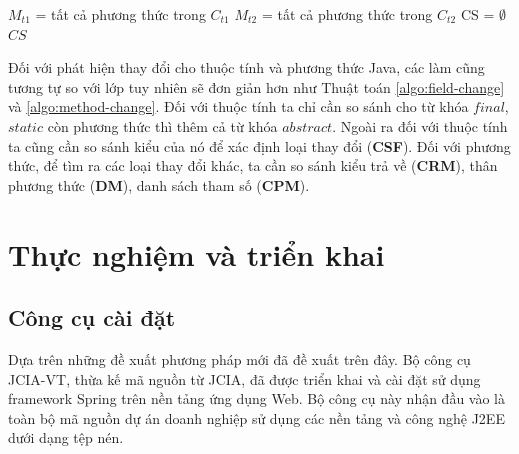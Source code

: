\documentclass[12pt]{report}
\newenvironment{thuattoan}[1][h]
  {\renewcommand{\algorithmcfname}{Thuật toán}
   \begin{algorithm}[#1]
  }{\end{algorithm}}
\begin{document}
\begin{thuattoan}
	\label{algo:method-change}
	\caption{$MethodChange(C_{t1}, C_{t2})$}
	
	$M_{t1}$ = tất cả phương thức trong $C_{t1}$\;
	$M_{t2}$ = tất cả phương thức trong $C_{t2}$\;
	CS = $\emptyset$\;
	\Return $CS$\;
\end{thuattoan}

Đối với phát hiện thay đổi cho thuộc tính và phương thức Java, các làm cũng tương tự so với lớp tuy nhiên sẽ đơn giản hơn như Thuật toán \ref{algo:field-change} và \ref{algo:method-change}. Đối với thuộc tính ta chỉ cần so sánh cho từ khóa $final$, $static$ còn phương thức thì thêm cả từ khóa $abstract$. Ngoài ra đối với thuộc tính ta cũng cần so sánh kiểu của nó để xác định loại thay đổi (\textbf{CSF}). Đối với phương thức, để tìm ra các loại thay đổi khác, ta cần so sánh kiểu trả về (\textbf{CRM}), thân phương thức (\textbf{DM}), danh sách tham số (\textbf{CPM}).

\chapter{Thực nghiệm và triển khai}
\section{Công cụ cài đặt}
Dựa trên những đề xuất phương pháp mới đã đề xuất trên đây. Bộ công cụ JCIA-VT, thừa kế mã nguồn từ JCIA, đã được triển khai và cài đặt sử dụng framework Spring trên nền tảng ứng dụng Web. Bộ công cụ này nhận đầu vào là toàn bộ mã nguồn dự án doanh nghiệp sử dụng các nền tảng và công nghệ J2EE dưới dạng tệp nén.
\end{document}
